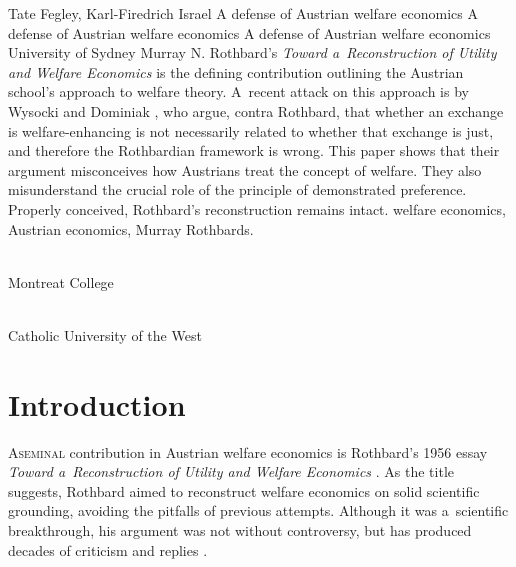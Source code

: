\begin{artengenv2auth}{Tate Fegley, Karl-Firedrich Israel}
	{A defense of Austrian welfare economics}
		{A defense of Austrian welfare economics}
		{A defense of Austrian welfare economics}
	{University of Sydney}
	{Murray N. Rothbard's \textit{Toward a~Reconstruction of Utility and Welfare Economics} is the defining contribution outlining the Austrian school's approach to welfare theory. A~recent attack on this approach is by Wysocki and Dominiak 
	\parencite*[][]{wysocki_how_2023}, %
	 who argue, contra Rothbard, that whether an exchange is welfare-enhancing is not necessarily related to whether that exchange is just, and therefore the Rothbardian framework is wrong. This paper shows that their argument misconceives how Austrians treat the concept of welfare. They also misunderstand the crucial role of the principle of demonstrated preference. Properly conceived, Rothbard's reconstruction remains intact.
		}
		{welfare economics, Austrian economics, Murray Rothbards.}
	{%
		{\flushright{}\\\subsubsectit\small{Montreat College}\par}%
		{\flushright{}\\\subsubsectit\small{Catholic University of the West}\par}%
	}




\section{Introduction}

\lettrine[loversize=0.13,lines=2,lraise=-0.03,nindent=0em,findent=0.2pt]%
{A}{seminal} %
contribution in Austrian welfare economics is Rothbard's 1956 essay \textit{Toward a~Reconstruction of Utility and Welfare Economics} 
\parencite[][]{rothbard_toward_2011}. %
 As the title suggests, Rothbard aimed to reconstruct welfare economics on solid scientific grounding, avoiding the pitfalls of previous attempts. Although it was a~scientific breakthrough, his argument was not without controversy, but has produced decades of criticism and replies 
\parencites[][]{block_austrian_1999}[][]{caplan_austrian_1999}[][]{cordato_welfare_1992}[][]{gordon_toward_1993}[][]{herbener_pareto_1997}[][]{herbener_defense_2008}[][]{hulsmann_economic_1999}[][]{kvasnicka_rothbards_2008}[][]{prychitko_formalism_1993}.%





\end{artengenv2auth}
